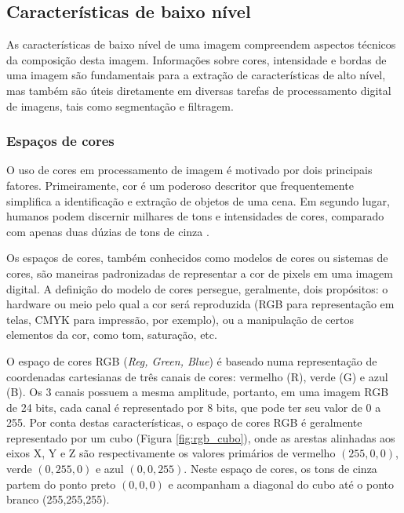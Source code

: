 \subsection{Características de baixo nível}

As características de baixo nível de uma imagem compreendem aspectos técnicos da composição desta imagem. Informações sobre cores, intensidade e bordas de uma imagem são fundamentais para a extração de características de alto nível, mas também são úteis diretamente em diversas tarefas de processamento digital de imagens, tais como segmentação e filtragem.

\subsubsection*{Espaços de cores}

O uso de cores em processamento de imagem é motivado por dois principais fatores. Primeiramente, cor é um poderoso descritor que frequentemente simplifica a identificação e extração de objetos de uma cena. Em segundo lugar, humanos podem discernir milhares de tons e intensidades de cores, comparado com apenas duas dúzias de tons de cinza \cite{gonzalez:2002}.

Os espaços de cores, também conhecidos como modelos de cores ou sistemas de cores, são maneiras padronizadas de representar a cor de pixels em uma imagem digital. A definição do modelo de cores persegue, geralmente, dois propósitos: o hardware ou meio pelo qual a cor será reproduzida (RGB para representação em telas, CMYK para impressão, por exemplo), ou a manipulação de certos elementos da cor, como tom, saturação, etc.

O espaço de cores RGB (\textit{Reg, Green, Blue}) é baseado numa representação de coordenadas cartesianas de três canais de cores: vermelho (R), verde (G) e azul (B). Os 3 canais possuem a mesma amplitude, portanto, em uma imagem RGB de 24 bits, cada canal é representado por 8 bits, que pode ter seu valor de 0 a 255. Por conta destas características, o espaço de cores RGB é geralmente representado por um cubo (Figura \ref{fig:rgb_cubo}), onde as arestas alinhadas aos eixos X, Y e Z são respectivamente os valores primários de vermelho $(255,0,0)$, verde $(0,255,0)$ e azul $(0,0,255)$. Neste espaço de cores, os tons de cinza partem do ponto preto $(0,0,0)$ e acompanham a diagonal do cubo até o ponto branco (255,255,255).

